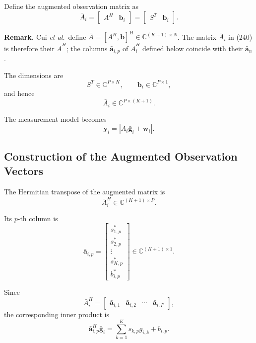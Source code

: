 \documentclass[12pt,a4paper]{article}
\begin{document}
Define the augmented observation matrix as
\begin{equation}
\boxed{
\bar A_i
=
\begin{bmatrix}
A^H&\mathbf b_i
\end{bmatrix}
=
\begin{bmatrix}
S^T&\mathbf b_i
\end{bmatrix}
}.
\tag{240}
\end{equation}

\textbf{Remark.} Cui \emph{et al.}\ define
$\bar A=[A^H,\mathbf b]^H\in\mathbb C^{(K+1)\times N}$. The matrix
$\bar A_i$ in (240) is therefore their $\bar A^H$; the columns
$\bar{\mathbf a}_{i,p}$ of $\bar A_i^H$ defined below coincide with
their $\bar{\mathbf a}_n$.

The dimensions are
\begin{equation}
S^T\in\mathbb{C}^{P\times K},
\qquad
\mathbf b_i\in\mathbb{C}^{P\times1},
\tag{241}
\end{equation}
and hence
\begin{equation}
\boxed{
\bar A_i
\in
\mathbb{C}^{P\times(K+1)}
}.
\tag{242}
\end{equation}

The measurement model becomes
\begin{equation}
\boxed{
\mathbf y_i
=
\left|
\bar A_i\bar{\mathbf g}_i+\mathbf w_i
\right|
}.
\tag{243}
\end{equation}

\subsection{Construction of the Augmented Observation Vectors}

The Hermitian transpose of the augmented matrix is
\begin{equation}
\bar A_i^H
\in
\mathbb{C}^{(K+1)\times P}.
\tag{244}
\end{equation}

Its $p$-th column is
\begin{equation}
\boxed{
\bar{\mathbf a}_{i,p}
=
\begin{bmatrix}
s_{1,p}^*\\
s_{2,p}^*\\
\vdots\\
s_{K,p}^*\\
b_{i,p}^*
\end{bmatrix}
\in
\mathbb{C}^{(K+1)\times1}
}.
\tag{245}
\end{equation}

Since
\begin{equation}
\bar A_i^H
=
\begin{bmatrix}
\bar{\mathbf a}_{i,1}&
\bar{\mathbf a}_{i,2}&
\cdots&
\bar{\mathbf a}_{i,P}
\end{bmatrix},
\tag{246}
\end{equation}
the corresponding inner product is
\begin{equation}
\bar{\mathbf a}_{i,p}^H\bar{\mathbf g}_i
=
\sum_{k=1}^{K}
s_{k,p}g_{i,k}
+
b_{i,p}.
\tag{247}
\end{equation}
\end{document}
